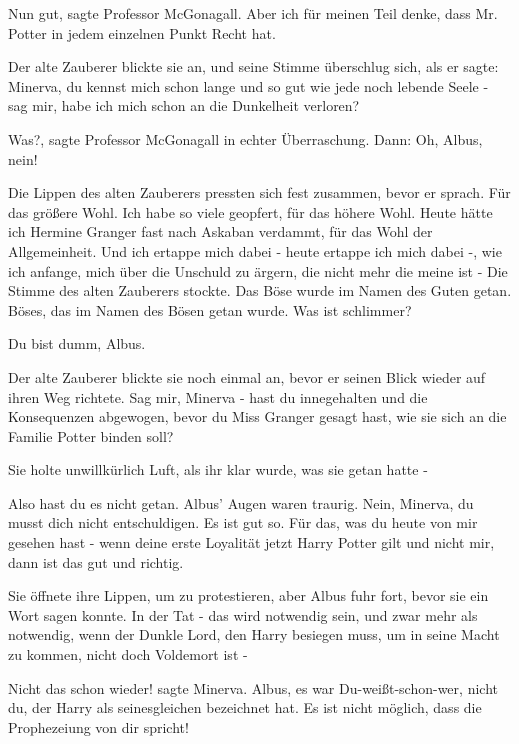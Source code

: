 \glqq{}Nun gut\grqq{}, sagte Professor McGonagall. \glqq{}Aber ich für meinen Teil
denke, dass Mr. Potter in jedem einzelnen Punkt Recht hat.\grqq{}

Der alte Zauberer blickte sie an, und seine Stimme überschlug sich, als er
sagte: \glqq{}Minerva, du kennst mich schon lange und so gut wie jede noch
lebende Seele - sag mir, habe ich mich schon an die Dunkelheit verloren?\grqq{}

\glqq{}Was?\grqq{}, sagte Professor McGonagall in echter Überraschung. Dann:
\glqq{}Oh, Albus, nein!\grqq{}

Die Lippen des alten Zauberers pressten sich fest zusammen, bevor er sprach.
\glqq{}Für das größere Wohl. Ich habe so viele geopfert, für das höhere Wohl.
Heute hätte ich Hermine Granger fast nach Askaban verdammt, für das Wohl der
Allgemeinheit. Und ich ertappe mich dabei - heute ertappe ich mich dabei -, wie
ich anfange, mich über die Unschuld zu ärgern, die nicht mehr die meine ist
-\grqq{} Die Stimme des alten Zauberers stockte. \glqq{}Das Böse wurde im Namen
des Guten getan. Böses, das im Namen des Bösen getan wurde. Was ist
schlimmer?\grqq{}

\glqq{}Du bist dumm, Albus.\grqq{}

Der alte Zauberer blickte sie noch einmal an, bevor er seinen Blick wieder auf
ihren Weg richtete. \glqq{}Sag mir, Minerva - hast du innegehalten und die
Konsequenzen abgewogen, bevor du Miss Granger gesagt hast, wie sie sich an die
Familie Potter binden soll?\grqq{}

Sie holte unwillkürlich Luft, als ihr klar wurde, was sie getan hatte -

\glqq{}Also hast du es nicht getan.\grqq{} Albus' Augen waren traurig. \glqq{}
Nein, Minerva, du musst dich nicht entschuldigen. Es ist gut so. Für das, was du
heute von mir gesehen hast - wenn deine erste Loyalität jetzt Harry Potter gilt
und nicht mir, dann ist das gut und richtig.\grqq{}

Sie öffnete ihre Lippen, um zu protestieren, aber Albus fuhr fort, bevor sie ein
Wort sagen konnte. \glqq{}In der Tat - das wird notwendig sein, und zwar mehr als
notwendig, wenn der Dunkle Lord, den Harry besiegen muss, um in seine Macht zu
kommen, nicht doch Voldemort ist -\grqq{}

\glqq{}Nicht das schon wieder!\grqq{} sagte Minerva. \glqq{}Albus, es war
Du-weißt-schon-wer, nicht du, der Harry als seinesgleichen bezeichnet hat. Es
ist nicht möglich, dass die Prophezeiung von dir spricht!\grqq{}

